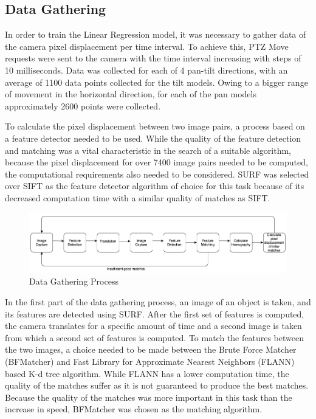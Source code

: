 \documentclass{l4proj}
\begin{document}
\subsection{Data Gathering}


In order to train the Linear Regression model, it was necessary to gather data of the camera pixel displacement per time interval. To achieve this, PTZ Move requests were sent to the camera with the time interval increasing with steps of 10 milliseconds. Data was collected for each of 4 pan-tilt directions, with an average of 1100 data points collected for the tilt models. Owing to a bigger range of movement in the horizontal direction, for each of the pan models approximately 2600 points were collected. 


To calculate the pixel displacement between two image pairs, a process based on a feature detector needed to be used. While the quality of the feature detection and matching was a vital characteristic in the search of a suitable algorithm, because the pixel displacement for over 7400 image pairs needed to be computed, the computational requirements also needed to be considered. SURF was selected over SIFT as the feature detector algorithm of choice for this task because of its decreased computation time with a similar quality of matches as SIFT. 

\begin{figure}[ht]
    \centering
    \includegraphics[width=1\textwidth]{l4template-master/images/dataGathering.png}
    \caption{Data Gathering Process}
    \label{datagathering}
\end{figure}


In the first part of the data gathering process, an image of an object is taken, and its features are detected using SURF. After the first set of features is computed, the camera translates for a specific amount of time and a second image is taken from which a second set of features is computed. To match the features between the two images, a choice needed to be made between the Brute Force Matcher (BFMatcher) and Fast Library for Approximate Nearest Neighbors (FLANN) based K-d tree algorithm. While FLANN has a lower computation time, the quality of the matches suffer as it is not guaranteed to produce the best matches. Because the quality of the matches was more important in this task than the increase in speed, BFMatcher was chosen as the matching algorithm. 
\end{document}
